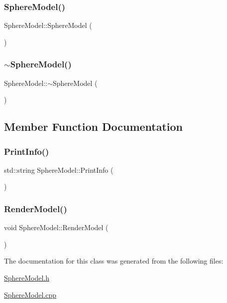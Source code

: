 \subsubsection{\texorpdfstring{SphereModel()}{SphereModel()}}
{\footnotesize\ttfamily Sphere\+Model\+::\+Sphere\+Model (\begin{DoxyParamCaption}{ }\end{DoxyParamCaption})}

\mbox{\label{class_sphere_model_a7aefce5e0d8b54ffd42287b85b0e684c}} 
\subsubsection{\texorpdfstring{$\sim$SphereModel()}{~SphereModel()}}
{\footnotesize\ttfamily Sphere\+Model\+::$\sim$\+Sphere\+Model (\begin{DoxyParamCaption}{ }\end{DoxyParamCaption})}



\subsection{Member Function Documentation}
\mbox{\label{class_sphere_model_a55d41706d2e3f67bb0401d361cc4a426}} 
\subsubsection{\texorpdfstring{PrintInfo()}{PrintInfo()}}
{\footnotesize\ttfamily std\+::string Sphere\+Model\+::\+Print\+Info (\begin{DoxyParamCaption}{ }\end{DoxyParamCaption})}

\mbox{\label{class_sphere_model_a3ac469e318f16ff912f6c50e9304c2a3}} 
\subsubsection{\texorpdfstring{RenderModel()}{RenderModel()}}
{\footnotesize\ttfamily void Sphere\+Model\+::\+Render\+Model (\begin{DoxyParamCaption}{ }\end{DoxyParamCaption})}



The documentation for this class was generated from the following files\+:\begin{DoxyCompactItemize}
\item 
\mbox{\hyperlink{_sphere_model_8h}{Sphere\+Model.\+h}}\item 
\mbox{\hyperlink{_sphere_model_8cpp}{Sphere\+Model.\+cpp}}\end{DoxyCompactItemize}
